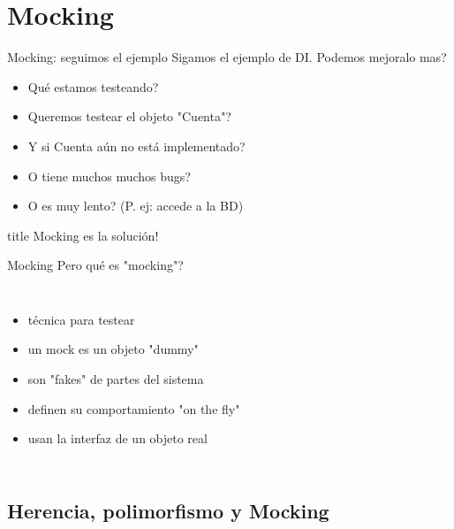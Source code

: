 \section{Mocking}

\begin{frame}[t]{Mocking: seguimos el ejemplo}
Sigamos el ejemplo de DI. \textquestiondown Podemos mejoralo mas?
\begin{itemize}
	\item \textquestiondown Qu\'e estamos testeando?
	\item \textquestiondown Queremos testear el objeto "Cuenta"?
	\item \textquestiondown Y si Cuenta a\'un no est\'a implementado?
	\item \textquestiondown O tiene muchos muchos bugs?
	\item \textquestiondown O es muy lento? (P. ej: accede a la BD)
\end{itemize}
\bigskip
\begin{beamercolorbox}[sep=.1cm,shadow=true,rounded=true,center]{title}
	Mocking es la soluci\'on!
\end{beamercolorbox}
\end{frame}

\begin{frame}{Mocking}
\textquestiondown Pero qu\'e es "mocking"?
\bigskip
\begin{columns}[onlytextwidth]
	\begin{itemize}
		\item t\'ecnica para testear
		\item un mock es un objeto "dummy"
		\item son "fakes" de partes del sistema 
		\item definen su comportamiento "on the fly"
		\item usan la interfaz de un objeto real
	\end{itemize}
\end{columns}
\end{frame}

\subsection{Herencia, polimorfismo y Mocking}

